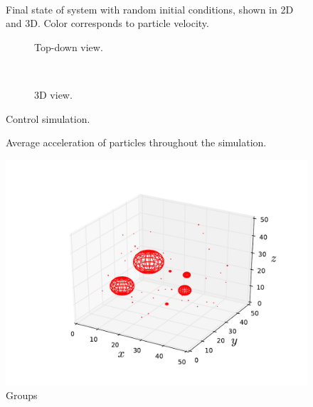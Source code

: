 \documentclass[10pt]{article}
\begin{document}
\begin{figure}[htbp]
\centering
\begin{subfigure}{\textwidth}
\centering

\end{subfigure} \\
\begin{subfigure}{\textwidth}
\centering

\end{subfigure}
\caption{Final state of system with random initial conditions, shown in 2D and 3D. Color corresponds to particle velocity.}
\label{fig:randomic}
\end{figure}

\begin{figure}[htbp]
\centering
\begin{subfigure}{\textwidth}
\centering

\caption{Top-down view.}
\end{subfigure} \\
\begin{subfigure}{\textwidth}
\centering

\caption{3D view.}
\end{subfigure}
\caption{Control simulation.}
\label{fig:control}
\end{figure}

\begin{figure}[htbp]
\centering

\label{fig:accel}
\caption{Average acceleration of particles throughout the simulation.}
\end{figure}

\begin{figure}[htbp]
\centering
\includegraphics{Control_Groups.pdf}
\caption{Groups}
\label{fig:groups}
\end{figure}
\end{document}
